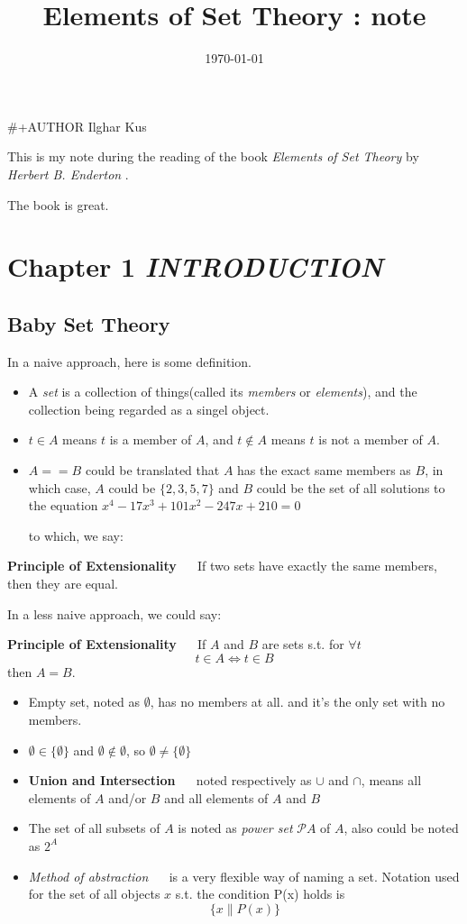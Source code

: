 \documentclass[11pt]{article}
\date{\today}
\title{Elements of Set Theory : note}
\begin{document}
\maketitle
\tableofcontents

\#+AUTHOR Ilghar Kus

This is my note during the reading
of the book \emph{Elements of Set Theory} by \emph{Herbert B. Enderton} .

The book is great.
\section{Chapter 1 \emph{INTRODUCTION}}
\label{sec:org94df578}
\subsection{Baby Set Theory}
\label{sec:org8b0b681}
In a naive approach, here is some definition.
\begin{itemize}
\item A \emph{set} is a collection of things(called its \emph{members} or \emph{elements}),
and the collection being regarded as a singel object.
\item \(t\in A\) means \(t\) is a member of \(A\), and \(t\notin A\) means \(t\) is not a member of \(A\).
\item \(A==B\) could be translated that \(A\) has the exact same members as \(B\), in which case,
\(A\) could be \(\{2,3,5,7\}\) and \(B\) could be the set of all solutions to the equation
\(x^4-17x^3+101x^2-247x+210=0\)

to which, we say:
\end{itemize}

\textbf{Principle of Extensionality} \(\quad\) If two sets have exactly the same members, 
then they are equal.

In a less naive approach, we could say:

\textbf{Principle of Extensionality} \(\quad\) If \(A\) and \(B\) are sets s.t. for \(\forall t\)
\[
   t\in A \iff t\in B
   \]
then \(A=B\).

\begin{itemize}
\item Empty set, noted as \(\emptyset\), has no members at all.
and it's the only set with no members.

\item \(\emptyset \in \{\emptyset\}\) and \(\emptyset \notin \emptyset\), so \(\emptyset \neq \{\emptyset\}\)

\item \textbf{Union and Intersection} \(\quad\) noted respectively as \(\cup\) and \(\cap\),
means all elements of \(A\) and/or \(B\) and all elements of \(A\) and \(B\)

\item The set of all subsets of \(A\) is noted as \emph{power set} \(\mathscr{P} A\) of \(A\),
also could be noted as \(2^{A}\)

\item \emph{Method of abstraction} \(\quad\) is a very flexible way of naming a set.
Notation used for the set of all objects \(x\) s.t. the condition P(x) holds is
\[
     \{x\|P(x)\}
     \]
\end{itemize}
\end{document}
